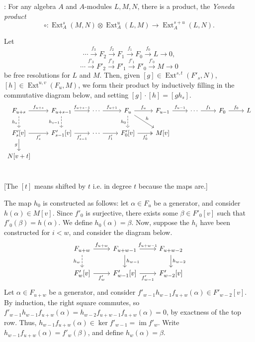 \documentclass{MetricNotes2023}
\DeclareMathOperator{\Ext}{Ext}
\DeclareMathOperator{\im}{im}
\begin{document}
\autocite{rognes2}: For any algebra \(A\) and \(A\)-modules \(L,M,N\), there is a product, the \textit{Yoneda product}
\[\circ : \Ext_A^s(M,N)\otimes \Ext^u_A(L,M)\to \Ext_A^{s+u}(L,N).\]

Let 
\[\cdots \xrightarrow{f_3} F_2 \xrightarrow{f_2} F_1 \xrightarrow{f_1} F_0 \xrightarrow{f_0} L\to 0,\]
\[\cdots \xrightarrow{f'_3} F'_2 \xrightarrow{f'_2} F'_1 \xrightarrow{f'_1} F'_0 \xrightarrow{f'_0} M\to 0\]
be free resolutions for \(L\) and \(M\). Then, given \([g] \in \Ext^{s,t}(F'_s, N)\), \([h]\in \Ext^{u,v}(F_u, M)\), we form their product by inductively filling in the commutative diagram below, and setting \([g]\cdot[h]=[gh_s]\). 
\[\begin{tikzcd} 
F_{u+s} \arrow[r, "f_{u+s}"] \arrow[d, swap, "h_s", dashrightarrow]  & F_{u+s-1} \arrow[r, "f_{u+s-1}"] \arrow[d, "h_{s-1}"', dashrightarrow] & \cdots \arrow[r, "f_{u+1}"] & F_u \arrow[d, "h_0"', dashrightarrow] \arrow[dr, "h"] \arrow[r, "f_u"] & F_{u-1} \arrow[r, "f_{u-1}"] & \cdots \arrow[r, "f_1"] & F_0 \arrow[r, "f_0"] & L \\ 
F'_{s}[v] \arrow[r, swap, "f'_s"] \arrow[d, swap, "g"] & F'_{s-1}[v] \arrow[r, "f'_{s-1}"'] & \cdots \arrow[r, "f'_1"'] & F'_0[v] \arrow[r, "f'_0"', twoheadrightarrow] & M[v] & & & \\ 
N[v+t] & & & & & & & \\ 
\end{tikzcd}\]

[The \([t]\) means shifted by \(t\) i.e. in degree \(t\) because the maps are.]

The map \(h_0\) is constructed as follows: let \(\alpha \in F_u\) be a generator, and consider \(h(\alpha)\in M[v]\). Since \(f'_0\) is surjective, there exists some \(\beta\in F'_0[v]\) such that \(f'_0(\beta)=h(\alpha)\). We define \(h_0(\alpha)=\beta\). Now, suppose the \(h_i\) have been constructed for \(i<w\), and consider the diagram below.
\[\begin{tikzcd}
F_{u+w} \arrow[r, "f_{u+w}"] \arrow[d, swap, "h_w", dashrightarrow]  & F_{u+w-1} \arrow[r, "f_{u+w-1}"] \arrow[d, "h_{w-1}"] & F_{u+w-2} \arrow[d, "h_{w-2}"] \\ 
F'_w[v] \arrow[r, swap, "f'_w"]  & F'_{w-1}[v] \arrow[r, "f'_{w-1}"'] & F'_{w-2}[v] 
 \end{tikzcd}\] 
Let \(\alpha\in F_{u+w}\) be a generator, and consider \(f'_{w-1}h_{w-1}f_{u+w}(\alpha)\in F'_{w-2}[v]\). By induction, the right square commutes, so \(f'_{w-1}h_{w-1}f_{u+w}(\alpha)=h_{w-2}f_{u+w-1}f_{u+w}(\alpha)=0\), by exactness of the top row. Thus, \(h_{w-1}f_{u+w}(\alpha)\in \ker f'_{w-1}=\im f'_w\). Write \(h_{w-1}f_{u+w}(\alpha)=f'_w(\beta)\), and define \(h_w(\alpha)=\beta\).  
\end{document}
